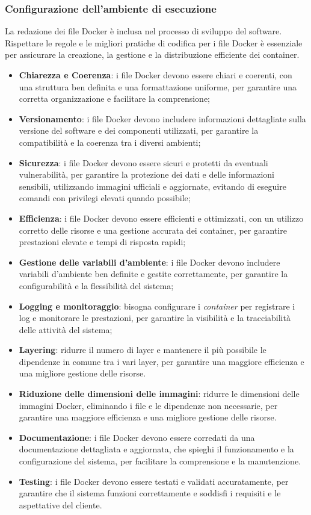 \subsubsection{Configurazione dell'ambiente di esecuzione}
La redazione dei file Docker è inclusa nel processo di sviluppo del software. Rispettare le regole e le migliori pratiche di codifica per i file Docker è essenziale per assicurare la creazione, la gestione e la distribuzione efficiente dei container.\\
\begin{itemize}
	\item \textbf{Chiarezza e Coerenza}: i file Docker devono essere chiari e coerenti, con una struttura ben definita e una formattazione uniforme, per garantire una corretta organizzazione e facilitare la comprensione;
	\item \textbf{Versionamento}: i file Docker devono includere informazioni dettagliate sulla versione del software e dei componenti utilizzati, per garantire la compatibilità e la coerenza tra i diversi ambienti;
	\item \textbf{Sicurezza}: i file Docker devono essere sicuri e protetti da eventuali vulnerabilità, per garantire la protezione dei dati e delle informazioni sensibili, utilizzando immagini ufficiali e aggiornate, evitando di eseguire comandi con privilegi elevati quando possibile;
	\item \textbf{Efficienza}: i file Docker devono essere efficienti e ottimizzati, con un utilizzo corretto delle risorse e una gestione accurata dei container, per garantire prestazioni elevate e tempi di risposta rapidi;
	\item \textbf{Gestione delle variabili d'ambiente}: i file Docker devono includere variabili d'ambiente ben definite e gestite correttamente, per garantire la configurabilità e la flessibilità del sistema;
	\item \textbf{Logging e monitoraggio}: bisogna configurare i \textit{container} per registrare i log e monitorare le prestazioni, per garantire la visibilità e la tracciabilità delle attività del sistema;
	\item \textbf{Layering}: ridurre il numero di layer e mantenere il più possibile le dipendenze in comune tra i vari layer, per garantire una maggiore efficienza e una migliore gestione delle risorse.
	\item \textbf{Riduzione delle dimensioni delle immagini}: ridurre le dimensioni delle immagini Docker, eliminando i file e le dipendenze non necessarie, per garantire una maggiore efficienza e una migliore gestione delle risorse.
	\item \textbf{Documentazione}: i file Docker devono essere corredati da una documentazione dettagliata e aggiornata, che spieghi il funzionamento e la configurazione del sistema, per facilitare la comprensione e la manutenzione.
	\item \textbf{Testing}: i file Docker devono essere testati e validati accuratamente, per garantire che il sistema funzioni correttamente e soddisfi i requisiti e le aspettative del cliente.
\end{itemize}

